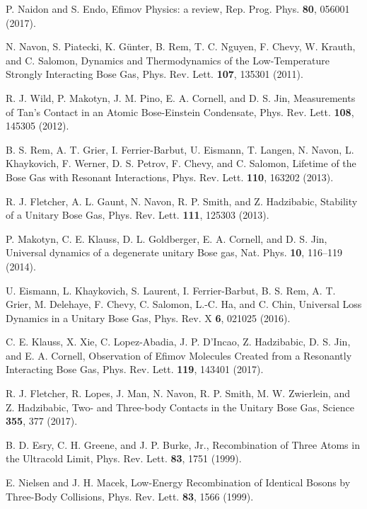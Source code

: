 \documentclass[aps,pra,twocolumn,showpacs,superscriptaddress]{revtex4}
\begin{document}
\begin{thebibliography}{100}
  P. Naidon and S. Endo,
  Efimov Physics: a review,
  Rep. Prog. Phys. {\bf{80}}, 056001 (2017).

  N. Navon, S. Piatecki, K. G\"unter, B. Rem, T. C. Nguyen, F. Chevy,
  W. Krauth, and C. Salomon,
Dynamics and Thermodynamics of the Low-Temperature Strongly Interacting Bose Gas,
Phys. Rev. Lett. {\bf{107}}, 135301 (2011).


R. J. Wild, P. Makotyn, J. M. Pino, E. A. Cornell, and D. S. Jin,
Measurements of Tan's Contact in an Atomic Bose-Einstein Condensate,
Phys. Rev. Lett. {\bf{108}}, 145305 (2012).

  B. S. Rem, A. T. Grier, I. Ferrier-Barbut, U. Eismann,
  T. Langen, N. Navon, L. Khaykovich, F. Werner, D. S. Petrov, F. Chevy, and C. Salomon,
Lifetime of the Bose Gas with Resonant Interactions,
Phys. Rev. Lett. {\bf{110}}, 163202 (2013).

  R. J. Fletcher, A. L. Gaunt, N. Navon, R. P. Smith, and Z. Hadzibabic,
Stability of a Unitary Bose Gas,
Phys. Rev. Lett. {\bf{111}}, 125303 (2013). 

P. Makotyn, C. E. Klauss, D. L. Goldberger, E. A. Cornell, and D. S. Jin,
Universal dynamics of a degenerate unitary Bose gas,
Nat. Phys. {\bf{10}}, 116–119 (2014).


  U. Eismann, L. Khaykovich, S. Laurent, I. Ferrier-Barbut, B. S. Rem,
  A. T. Grier, M. Delehaye, F. Chevy, C. Salomon, L.-C. Ha, and C. Chin,
    Universal Loss Dynamics in a Unitary Bose Gas,
Phys. Rev. X {\bf{6}}, 021025 (2016).

  C. E. Klauss, X. Xie, C. Lopez-Abadia, J. P. D'Incao, Z. Hadzibabic,
  D. S. Jin, and E. A. Cornell,
Observation of Efimov Molecules Created from a Resonantly Interacting Bose Gas,
Phys. Rev. Lett. {\bf{119}}, 143401 (2017).

  R. J. Fletcher, R. Lopes, J. Man, N. Navon,
  R. P. Smith, M. W. Zwierlein, and Z. Hadzibabic,
Two- and Three-body Contacts in the Unitary Bose Gas,
Science {\bf{355}}, 377 (2017). 

B. D. Esry, C. H. Greene, and J. P. Burke, Jr.,
Recombination of Three Atoms in the Ultracold Limit,
Phys. Rev. Lett. {\bf{83}}, 1751 (1999).

E. Nielsen and J. H. Macek,
Low-Energy Recombination of Identical Bosons by Three-Body Collisions,
Phys. Rev. Lett. {\bf{83}}, 1566 (1999). 


\end{thebibliography}
\end{document}
